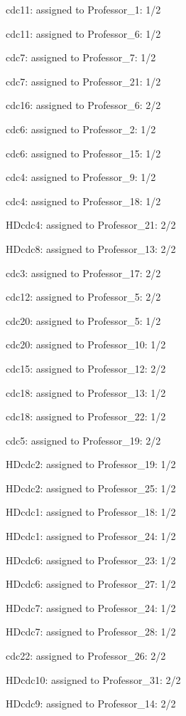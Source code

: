 \documentclass{article} %
\begin{document}
\noindent cdc11: assigned to Professor\_1: 1/2

\noindent cdc11: assigned to Professor\_6: 1/2

\noindent cdc7: assigned to Professor\_7: 1/2

\noindent cdc7: assigned to Professor\_21: 1/2

\noindent cdc16: assigned to Professor\_6: 2/2

\noindent cdc6: assigned to Professor\_2: 1/2

\noindent cdc6: assigned to Professor\_15: 1/2

\noindent cdc4: assigned to Professor\_9: 1/2

\noindent cdc4: assigned to Professor\_18: 1/2

\noindent HDcdc4: assigned to Professor\_21: 2/2

\noindent HDcdc8: assigned to Professor\_13: 2/2

\noindent cdc3: assigned to Professor\_17: 2/2

\noindent cdc12: assigned to Professor\_5: 2/2

\noindent cdc20: assigned to Professor\_5: 1/2

\noindent cdc20: assigned to Professor\_10: 1/2

\noindent cdc15: assigned to Professor\_12: 2/2

\noindent cdc18: assigned to Professor\_13: 1/2

\noindent cdc18: assigned to Professor\_22: 1/2

\noindent cdc5: assigned to Professor\_19: 2/2

\noindent HDcdc2: assigned to Professor\_19: 1/2

\noindent HDcdc2: assigned to Professor\_25: 1/2

\noindent HDcdc1: assigned to Professor\_18: 1/2

\noindent HDcdc1: assigned to Professor\_24: 1/2

\noindent HDcdc6: assigned to Professor\_23: 1/2

\noindent HDcdc6: assigned to Professor\_27: 1/2

\noindent HDcdc7: assigned to Professor\_24: 1/2

\noindent HDcdc7: assigned to Professor\_28: 1/2

\noindent cdc22: assigned to Professor\_26: 2/2

\noindent HDcdc10: assigned to Professor\_31: 2/2

\noindent HDcdc9: assigned to Professor\_14: 2/2
\end{document}
